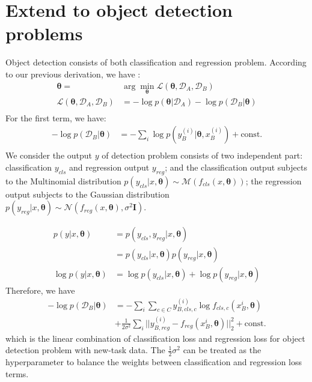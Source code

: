 \documentclass{article}
\begin{document}
\section{Extend to object detection problems}

Object detection consists of both classification and regression problem.
According to our previous derivation, we have :
\begin{equation}
\begin{split}
    \boldsymbol{\theta} = & \arg \min_{\boldsymbol{\theta}} \mathcal L(\boldsymbol{\theta}, \mathcal D_A, \mathcal D_B) \\
    \mathcal L(\boldsymbol{\theta}, \mathcal D_A, \mathcal D_B)  &= - \log p(\boldsymbol{\theta}|\mathcal D_A) - \log p(\mathcal D_B | \boldsymbol{\theta}) \\
\end{split}
\end{equation}
For the first term, we have:
\begin{equation}
\begin{split}
    - \log p(\mathcal D_B | \boldsymbol{\theta}) &=
    - \sum_i \log p(y_B^{(i)}| \boldsymbol{\theta}, x_B^{(i)})
    + \text{const.} \\
\end{split}
\end{equation}
We consider the output $y$ of detection problem consists of two independent part:
classification $y_{cls}$ and regression output $y_{reg}$;
and the classification output subjects to the Multinomial distribution
$p(y_{cls} | x, \boldsymbol{\theta}) \sim \mathcal M(f_{cls}(x, \boldsymbol{\theta}))$;
the regression output subjects to the Gaussian distribution
$p(y_{reg} | x, \boldsymbol{\theta}) \sim \mathcal N(f_{reg}(x, \boldsymbol{\theta}), \sigma^2 \boldsymbol{I})$.

\begin{equation}
\begin{split}
p(y|x, \boldsymbol{\theta}) &= p(y_{cls}, y_{reg}|x, \boldsymbol{\theta})\\
&= p(y_{cls}|x, \boldsymbol{\theta})p(y_{reg}|x, \boldsymbol{\theta}) \\
\log p(y|x, \boldsymbol{\theta}) &= 
\log p(y_{cls}|x, \boldsymbol{\theta})
+ \log p(y_{reg}|x, \boldsymbol{\theta})
\label{eq:multinomial_likelihood_det}
\end{split}
\end{equation}
Therefore, we have
\begin{equation}
\begin{split}
- \log p(\mathcal D_B | \boldsymbol{\theta}) &=
- \sum_i \sum_{c\in C} y_{B,cls,c}^{(i)} \log f_{cls, c}(x_{B}^{i}, \boldsymbol{\theta})\\
&+\frac{1}{2\sigma^2}  \sum_i ||y_{B,reg}^{(i)} - f_{reg}(x_{B}^{i}, \boldsymbol{\theta})||_2^2 + \text{const.}
\end{split}
\end{equation}
which is the linear combination of classification loss and regression loss for object detection problem
with new-task data.
The $\frac{1}{2} \sigma^2$ can be treated as the hyperparameter to
balance the weights between classification and regression loss terms.
\end{document}
